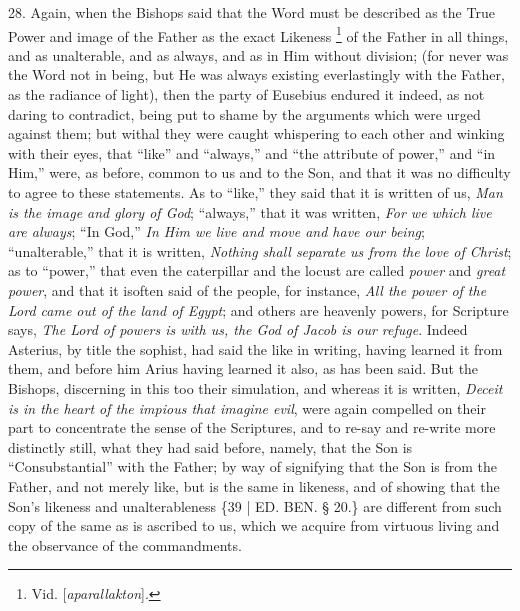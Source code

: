28. Again, when the Bishops
said that the Word must be described as the True Power and image
of the Father as the exact Likeness \footnote{Vid. [\emph{aparallakton}].} of the Father in all things, and as unalterable, and as
always, and as in Him without division; (for never was the Word not in
being, but He was always existing everlastingly with the Father, as
the radiance of light), then the party of Eusebius endured it indeed,
as not daring to contradict, being put to shame by the arguments which
were urged against them; but withal they were caught whispering to
each other and winking with their eyes, that ``like'' and ``always,'' and ``the
attribute of power,'' and ``in Him,'' were, as before, common to us and
to the Son, and that it was no difficulty to agree to these
statements. As to ``like,'' they said that it is written of us, \emph{Man
is the image and glory of God}; ``always,'' that it was written, \emph{For
we which live are always}; ``In God,'' \emph{In Him we live and move and
have our being}; ``unalterable,'' that it is written, \emph{Nothing
shall separate us from the love of Christ}; as to ``power,'' that
even the caterpillar and the locust are called \emph{power} and \emph{great
power}, and that it is\emph{}often said of the people, for
instance, \emph{All the power of the Lord came out of the land of Egypt};
and others are heavenly powers, for Scripture says, \emph{The Lord of
powers is with us, the God of Jacob is our refuge}. Indeed Asterius,
by title the sophist, had said the like in writing, having learned it
from them, and before him Arius having learned it also, as has been
said. But the Bishops, discerning in this too their simulation, and
whereas it is written, \emph{Deceit is in the heart of the impious that
imagine evil}, were again compelled on their part to concentrate
the sense of the Scriptures, and to re-say and re-write more
distinctly still, what they had said before, namely, that the Son is ``Consubstantial''
with the Father; by way of signifying that the Son is from the Father,
and not merely like, but is the same in likeness, and of showing that
the Son's likeness and unalterableness \{39 | ED. BEN.
§ 20.\} are different from such copy of the same as is ascribed to us,
which we acquire from virtuous living and the observance of the
commandments.

